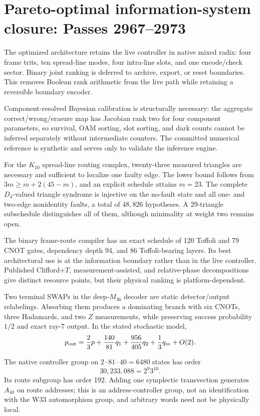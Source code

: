 \section{Pareto-optimal information-system closure: Passes 2967--2973}
\label{sec:bt2967-2973-optimal-is}

The optimized architecture retains the live controller in native mixed radix: four
frame trits, ten spread-line modes, four intra-line slots, and one encode/check
sector.  Binary joint ranking is deferred to archive, export, or reset boundaries.
This removes Boolean rank arithmetic from the live path while retaining a reversible
boundary encoder.

Component-resolved Bayesian calibration is structurally necessary: the aggregate
correct/wrong/erasure map has Jacobian rank two for four component parameters, so
survival, OAM sorting, slot sorting, and dark counts cannot be inferred separately
without intermediate counters.  The committed numerical reference is synthetic and
serves only to validate the inference engine.

For the $K_{10}$ spread-line routing complex, twenty-three measured triangles are
necessary and sufficient to localize one faulty edge.  The lower bound follows from
$3m\ge m+2(45-m)$, and an explicit schedule attains $m=23$.  The complete
$D_4$-valued triangle syndrome is injective on the no-fault state and all one- and
two-edge nonidentity faults, a total of $48{,}826$ hypotheses.  A 29-triangle
subschedule distinguishes all of them, although minimality at weight two remains
open.

The binary frame-route compiler has an exact schedule of 120 Toffoli and 79 CNOT
gates, dependency depth 94, and 86 Toffoli-bearing layers.  Its best architectural
use is at the information boundary rather than in the live controller.  Published
Clifford+$T$, measurement-assisted, and relative-phase decompositions give distinct
resource points, but their physical ranking is platform-dependent.

Two terminal SWAPs in the deep-$M_{36}$ decoder are static detector/output relabelings.
Absorbing them produces a dominating branch with six CNOTs, three Hadamards, and two
$Z$ measurements, while preserving success probability $1/2$ and exact ray-7
output.  In the stated stochastic model,
\[
 p_{\rm out}=\frac23p+\frac{140}{81}q_1+\frac{956}{405}q_2+\frac13q_m+O(2).
\]

The native controller group on $2\cdot81\cdot40=6480$ states has order
\[
 30{,}233{,}088=2^9 3^{10}.
\]
Its route subgroup has order 192.  Adding one symplectic transvection generates
$A_{40}$ on route addresses; this is an address-controller group, not an identification
with the W33 automorphism group, and arbitrary words need not be physically local.

